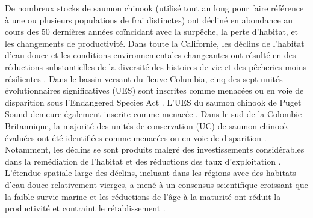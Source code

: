 De nombreux stocks de saumon chinook (utilisé tout au long pour faire référence à une ou plusieurs populations de frai distinctes) ont décliné en abondance au cours des 50 dernières années coïncidant avec la surpêche, la perte d'habitat, et les changements de productivité. Dans toute la Californie, les déclins de l'habitat d'eau douce et les conditions environnementales changeantes ont résulté en des réductions substantielles de la diversité des histoires de vie et des pêcheries moins résilientes \citep{munschOneHundredseventyYears2022}. Dans le bassin versant du fleuve Columbia, cinq des sept unités évolutionnaires significatives (UES) sont inscrites comme menacées ou en voie de disparition sous l'Endangered Species Act \citep{nmfsEndangeredSpeciesAct2020}. L'UES du saumon chinook de Puget Sound demeure également inscrite comme menacée \citep{fordStatusReviewUpdate2011}. Dans le sud de la Colombie-Britannique, la majorité des unités de conservation (UC) de saumon chinook évaluées ont été identifiées comme menacées ou en voie de disparition \citep{cosewicChinookSalmonOncorhynchus2018}. Notamment, les déclins se sont produits malgré des investissements considérables dans la remédiation de l'habitat \citep{jaegerReturnsInvestmentRestoration2023} et des réductions des taux d'exploitation \citep{ctc2021AnnualReport2022}. L'étendue spatiale large des déclins, incluant dans les régions avec des habitats d'eau douce relativement vierges, a mené à un consensus scientifique croissant que la faible survie marine et les réductions de l'âge à la maturité ont réduit la productivité et contraint le rétablissement \citep{dornerSpatialTemporalPatterns2017, ruffSalishSeaChinook2017, ohlbergerDemographicChangesChinook2018, welchSynthesisCoastwideDecline2021, freshwaterNonstationaryPatternsDemographic2022}.

